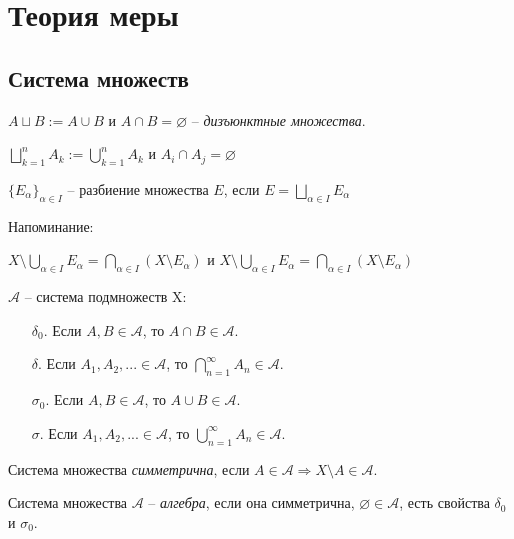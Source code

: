 \section{Теория меры}

\subsection{Система множеств}

$A \sqcup B := A \cup B$ и $A \cap B = \varnothing$ – \textit{дизъюнктные множества}.

$\bigsqcup\limits_{k=1}^n A_k := \bigcup\limits_{k=1}^n A_k$ и $A_i \cap A_j = \varnothing$

\begin{definition}
    $\{E_\alpha\}_{\alpha\in I}$ – разбиение множества $E$, если $E = \bigsqcup\limits_{\alpha\in I} E_\alpha$
\end{definition}

Напоминание:

$X \setminus  \bigcup\limits_{\alpha \in I} E_\alpha = \bigcap\limits_{\alpha \in I} (X\setminus E_\alpha)$ и 
$X \setminus  \bigcup\limits_{\alpha \in I} E_\alpha = \bigcap\limits_{\alpha \in I} (X\setminus E_\alpha)$

\begin{definition}
    $\mathcal{A}$ – система подмножеств X:
    \begin{enumerate}
        \item[$\delta_0$.] Если $A, B\in \mathcal{A}$, то $A\cap B\in \mathcal{A}$.
        \item[$\delta$.] Если $A_1, A_2, ...\in \mathcal{A}$, то $\bigcap\limits_{n = 1}^\infty A_n\in \mathcal{A}$.
        \item[$\sigma_0$.] Если $A, B\in \mathcal{A}$, то $A\cup B\in \mathcal{A}$.
        \item[$\sigma$.] Если $A_1, A_2, ...\in \mathcal{A}$, то $\bigcup\limits_{n = 1}^\infty A_n\in \mathcal{A}$.
    \end{enumerate}
\end{definition}

\begin{definition}
    Система множества \textit{симметрична}, если $A\in \mathcal{A}\Rightarrow X\setminus A\in \mathcal{A}$.
\end{definition}

\begin{definition}
    Система множества $\mathcal{A}$ – \textit{алгебра}, если она симметрична, $\varnothing \in \mathcal{A}$, есть свойства $\delta_0$ и $\sigma_0$.
\end{definition}

